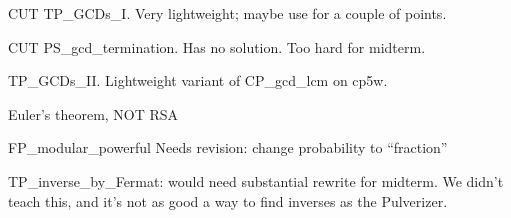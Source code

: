\documentclass[quiz]{mcs}
\begin{document}



\begin{staffnotes}
CUT TP\_GCDs\_I.  Very lightweight; maybe use for a couple of points.
\end{staffnotes}

\begin{staffnotes}
CUT PS\_gcd\_termination.  Has no solution.  Too hard for midterm.
\end{staffnotes}



\begin{staffnotes}
TP\_GCDs\_II.  Lightweight variant of CP\_gcd\_lcm on cp5w.
\end{staffnotes}

\begin{center}
{\large Euler's theorem, NOT RSA}
\end{center}




\begin{staffnotes}
FP\_modular\_powerful Needs revision: change probability to ``fraction''
\end{staffnotes}



\begin{staffnotes}
TP\_inverse\_by\_Fermat: would need substantial rewrite for midterm.
We didn't teach this, and it's not as good a way to find inverses as
the Pulverizer.
\end{staffnotes}

\end{document}
